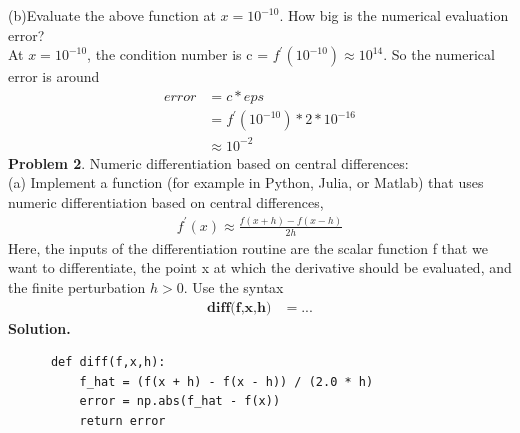 \documentclass{article}
\begin{document}
\indent (b)Evaluate the above function at $x = 10^{-10} $. How big is the numerical evaluation error?\\
   \indent  At  $x= 10^{-10}$, the condition number is c = $f^{'}(10^{-10})\approx 10^{14}$. So the numerical error is around
      \begin{align*}
      error & = c * eps\\
            & = f^{'}(10^{-10})* 2*10^{-16}\\
            & \approx 10^{-2}
      \end{align*}
\noindent \textbf{Problem 2}. Numeric differentiation based on central differences:\\
\indent (a) Implement a function (for example in Python, Julia, or Matlab) that uses numeric differentiation based on central differences,\\
  \begin{align*}
  	f^{'}(x) \approx\frac{f(x+h)-f(x-h)}{2h}
  \end{align*}
\indent Here, the inputs of the differentiation routine are the scalar function f that we want to differentiate, the point x at which the derivative should be evaluated, and the finite perturbation $h>0$. Use the syntax
   \begin{align*}
   \textbf{diff(f,x,h)} &= ...
   \end{align*}
   \textbf{Solution.}
   \begin{lstlisting}
   	  def diff(f,x,h):
   	      f_hat = (f(x + h) - f(x - h)) / (2.0 * h)
   	      error = np.abs(f_hat - f(x))
   	      return error
   \end{lstlisting}
   
\end{document}
